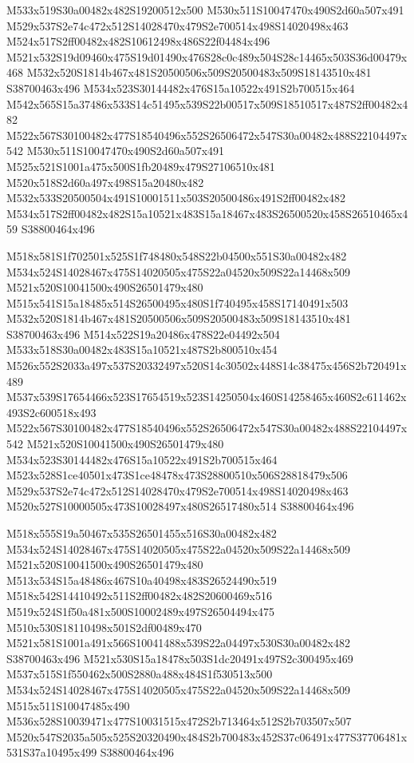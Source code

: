 \documentclass{article}
\begin{document}
\begin{multicols}{2}
M533x519S30a00482x482S19200512x500 M530x511S10047470x490S2d60a507x491 M529x537S2e74c472x512S14028470x479S2e700514x498S14020498x463 M524x517S2ff00482x482S10612498x486S22f04484x496 M521x532S19d09460x475S19d01490x476S28c0c489x504S28c14465x503S36d00479x468 M532x520S1814b467x481S20500506x509S20500483x509S18143510x481 S38700463x496 M534x523S30144482x476S15a10522x491S2b700515x464 M542x565S15a37486x533S14c51495x539S22b00517x509S18510517x487S2ff00482x482 M522x567S30100482x477S18540496x552S26506472x547S30a00482x488S22104497x542 M530x511S10047470x490S2d60a507x491 M525x521S1001a475x500S1fb20489x479S27106510x481 M520x518S2d60a497x498S15a20480x482 M532x533S20500504x491S10001511x503S20500486x491S2ff00482x482 M534x517S2ff00482x482S15a10521x483S15a18467x483S26500520x458S26510465x459 S38800464x496

M518x581S1f702501x525S1f748480x548S22b04500x551S30a00482x482 M534x524S14028467x475S14020505x475S22a04520x509S22a14468x509 M521x520S10041500x490S26501479x480 M515x541S15a18485x514S26500495x480S1f740495x458S17140491x503 M532x520S1814b467x481S20500506x509S20500483x509S18143510x481 S38700463x496 M514x522S19a20486x478S22e04492x504 M533x518S30a00482x483S15a10521x487S2b800510x454 M526x552S2033a497x537S20332497x520S14c30502x448S14c38475x456S2b720491x489 M537x539S17654466x523S17654519x523S14250504x460S14258465x460S2c611462x493S2c600518x493 M522x567S30100482x477S18540496x552S26506472x547S30a00482x488S22104497x542 M521x520S10041500x490S26501479x480 M534x523S30144482x476S15a10522x491S2b700515x464 M523x528S1ce40501x473S1ce48478x473S28800510x506S28818479x506 M529x537S2e74c472x512S14028470x479S2e700514x498S14020498x463 M520x527S10000505x473S10028497x480S26517480x514 S38800464x496

M518x555S19a50467x535S26501455x516S30a00482x482 M534x524S14028467x475S14020505x475S22a04520x509S22a14468x509 M521x520S10041500x490S26501479x480 M513x534S15a48486x467S10a40498x483S26524490x519 M518x542S14410492x511S2ff00482x482S20600469x516 M519x524S1f50a481x500S10002489x497S26504494x475 M510x530S18110498x501S2df00489x470 M521x581S1001a491x566S10041488x539S22a04497x530S30a00482x482 S38700463x496 M521x530S15a18478x503S1dc20491x497S2c300495x469 M537x515S1f550462x500S2880a488x484S1f530513x500 M534x524S14028467x475S14020505x475S22a04520x509S22a14468x509 M515x511S10047485x490 M536x528S10039471x477S10031515x472S2b713464x512S2b703507x507 M520x547S2035a505x525S20320490x484S2b700483x452S37c06491x477S37706481x531S37a10495x499 S38800464x496


\end{multicols}
\end{document}
